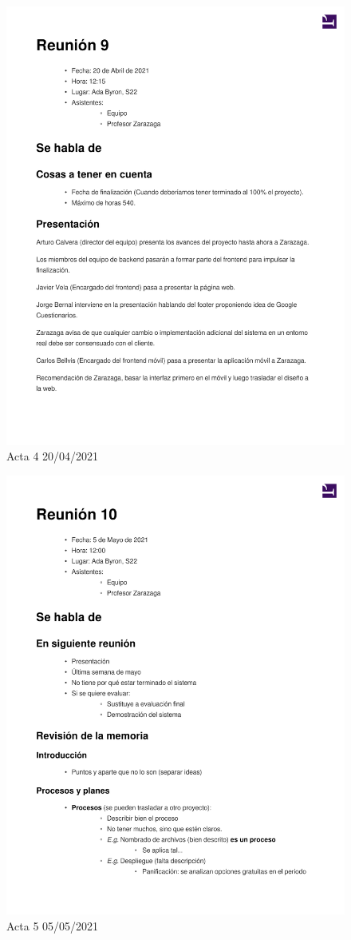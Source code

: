 \documentclass{article}
\begin{document}
\begin{figure}[H]
   \includegraphics[width=.8\textwidth]{../../actas_reuniones/2021.04.20_4_Actas.pdf}
   \caption{Acta 4 20/04/2021}
\end{figure}
\begin{figure}[H]
   \includegraphics[width=.8\textwidth]{../../actas_reuniones/2021.05.05_5_Actas.pdf}
   \caption{Acta 5 05/05/2021}
\end{figure}
\end{document}
